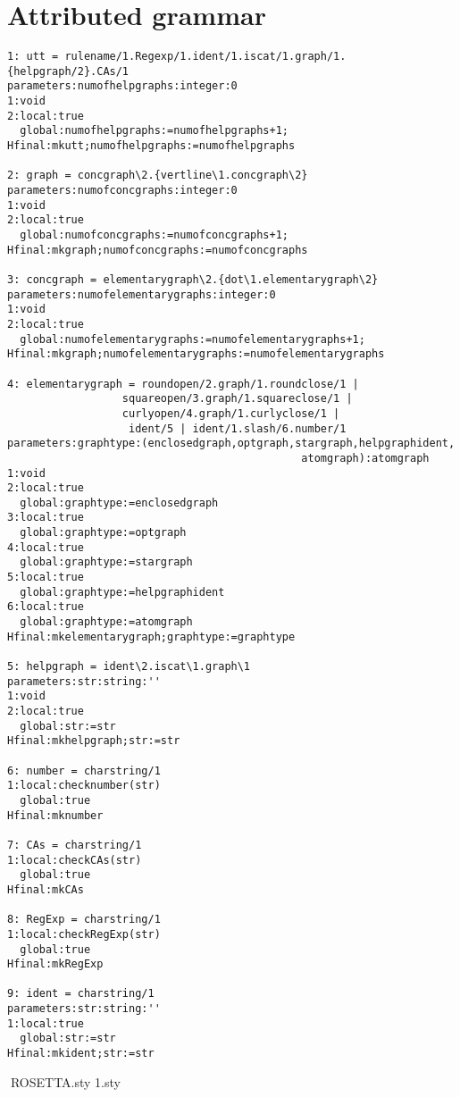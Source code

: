 \section{Attributed grammar}
\begin{verbatim}
1: utt = rulename/1.Regexp/1.ident/1.iscat/1.graph/1.{helpgraph/2}.CAs/1
parameters:numofhelpgraphs:integer:0
1:void
2:local:true
  global:numofhelpgraphs:=numofhelpgraphs+1;
Hfinal:mkutt;numofhelpgraphs:=numofhelpgraphs

2: graph = concgraph\2.{vertline\1.concgraph\2}
parameters:numofconcgraphs:integer:0
1:void
2:local:true
  global:numofconcgraphs:=numofconcgraphs+1;
Hfinal:mkgraph;numofconcgraphs:=numofconcgraphs

3: concgraph = elementarygraph\2.{dot\1.elementarygraph\2}
parameters:numofelementarygraphs:integer:0
1:void
2:local:true
  global:numofelementarygraphs:=numofelementarygraphs+1;
Hfinal:mkgraph;numofelementarygraphs:=numofelementarygraphs

4: elementarygraph = roundopen/2.graph/1.roundclose/1 |
                  squareopen/3.graph/1.squareclose/1 |
                  curlyopen/4.graph/1.curlyclose/1 |
                   ident/5 | ident/1.slash/6.number/1
parameters:graphtype:(enclosedgraph,optgraph,stargraph,helpgraphident,
                                              atomgraph):atomgraph
1:void
2:local:true
  global:graphtype:=enclosedgraph
3:local:true
  global:graphtype:=optgraph
4:local:true
  global:graphtype:=stargraph
5:local:true
  global:graphtype:=helpgraphident
6:local:true
  global:graphtype:=atomgraph
Hfinal:mkelementarygraph;graphtype:=graphtype

5: helpgraph = ident\2.iscat\1.graph\1
parameters:str:string:''
1:void
2:local:true
  global:str:=str
Hfinal:mkhelpgraph;str:=str

6: number = charstring/1
1:local:checknumber(str)
  global:true
Hfinal:mknumber

7: CAs = charstring/1
1:local:checkCAs(str)
  global:true
Hfinal:mkCAs

8: RegExp = charstring/1
1:local:checkRegExp(str)
  global:true
Hfinal:mkRegExp

9: ident = charstring/1
parameters:str:string:''
1:local:true
  global:str:=str
Hfinal:mkident;str:=str

\end{verbatim}


ROSETTA.sty
\def\@ptsize{1}
\@namedef{ds@10pt}{\def\@ptsize{0}}
\@namedef{ds@12pt}{\def\@ptsize{2}}
\@twosidetrue
\@mparswitchtrue
\def\ds@draft{\overfullrule 5pt}
\@options
\@ptsize.sty\relax


